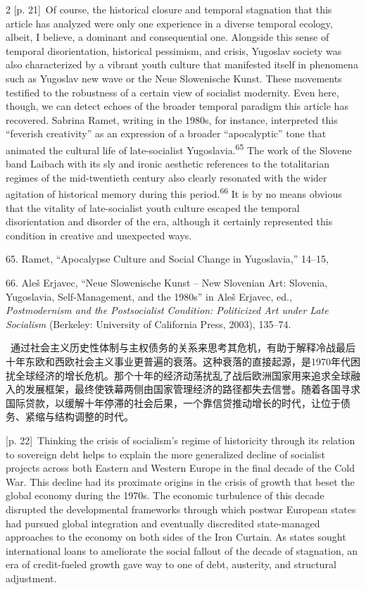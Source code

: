 \documentclass[10pt,a4paper]{article}
\begin{document}
\begin{paracol}{2}
\switchcolumn
{\scriptsize\color{gray} [p. 21]}\ Of course, the historical closure and temporal stagnation that this article has analyzed were only one experience in a diverse temporal ecology, albeit, I believe, a dominant and consequential one. Alongside this sense of temporal disorientation, historical pessimism, and crisis, Yugoslav society was also characterized by a vibrant youth culture that manifested itself in phenomena such as Yugoslav new wave or the Neue Slowenische Kunst. These movements testified to the robustness of a certain view of socialist modernity. Even here, though, we can detect echoes of the broader temporal paradigm this article has recovered. Sabrina Ramet, writing in the 1980s, for instance, interpreted this “feverish creativity” as an expression of a broader “apocalyptic” tone that animated the cultural life of late-socialist Yugoslavia.\nobreak\textsuperscript{65} The work of the Slovene band Laibach with its sly and ironic aesthetic references to the totalitarian regimes of the mid-twentieth century also clearly resonated with the wider agitation of historical memory during this period.\nobreak\textsuperscript{66} It is by no means obvious that the vitality of late-socialist youth culture escaped the temporal disorientation and disorder of the era, although it certainly represented this condition in creative and unexpected ways.\par{\small 65. Ramet, “Apocalypse Culture and Social Change in Yugoslavia,” 14–15,\par}{\small 66. Aleš Erjavec, “Neue Slowenische Kunst – New Slovenian Art: Slovenia, Yugoslavia, Self-Management, and the 1980s” in Aleš Erjavec, ed., \textit{Postmodernism and the Postsocialist Condition: Politicized Art under Late Socialism} (Berkeley: University of California Press, 2003), 135–74.\par}
\switchcolumn*
{\scriptsize\color{gray} [p. 22]}\ 通过社会主义历史性体制与主权债务的关系来思考其危机，有助于解释冷战最后十年东欧和西欧社会主义事业更普遍的衰落。这种衰落的直接起源，是1970年代困扰全球经济的增长危机。那个十年的经济动荡扰乱了战后欧洲国家用来追求全球融入的发展框架，最终使铁幕两侧由国家管理经济的路径都失去信誉。随着各国寻求国际贷款，以缓解十年停滞的社会后果，一个靠信贷推动增长的时代，让位于债务、紧缩与结构调整的时代。\par
\switchcolumn
{\scriptsize\color{gray} [p. 22]}\ Thinking the crisis of socialism’s regime of historicity through its relation to sovereign debt helps to explain the more generalized decline of socialist projects across both Eastern and Western Europe in the final decade of the Cold War. This decline had its proximate origins in the crisis of growth that beset the global economy during the 1970s. The economic turbulence of this decade disrupted the developmental frameworks through which postwar European states had pursued global integration and eventually discredited state-managed approaches to the economy on both sides of the Iron Curtain. As states sought international loans to ameliorate the social fallout of the decade of stagnation, an era of credit-fueled growth gave way to one of debt, austerity, and structural adjustment.\par

\end{paracol}
\end{document}
